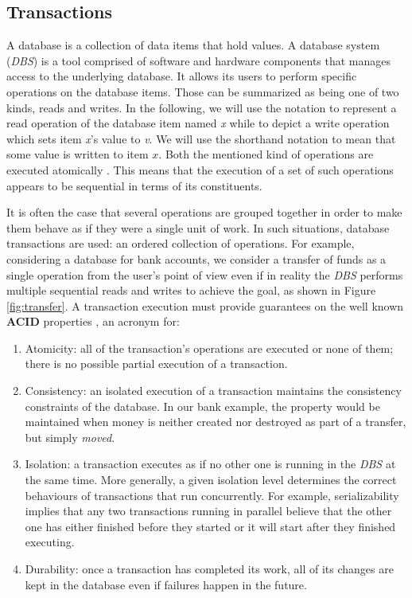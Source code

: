 \tocless\subsection{Transactions}

A database is a collection of data items that hold values. A database system (\textit{DBS}) is a tool comprised of software and hardware components that manages access to the underlying database. It allows its users to perform specific operations on the database items. Those can be summarized as being one of two kinds, reads and writes. In the following, we will use the notation  to represent a read operation of the database item named \textit{x} while  to depict a write operation which sets item \textit{x}'s value to \textit{v}. We will use the shorthand notation  to mean that some value is written to item $x$. Both the mentioned kind of operations are executed atomically \cite{ccontrol}. This means that the execution of a set of such operations appears to be sequential in terms of its constituents.

It is often the case that several operations are grouped together in order to make them behave as if they were a single unit of work. In such situations, database transactions are used: an ordered collection of operations. For example, considering a database for bank accounts, we consider a transfer of funds as a single operation from the user's point of view even if in reality the \textit{DBS} performs multiple sequential reads and writes to achieve the goal, as shown in Figure \ref{fig:transfer}. A transaction execution must provide guarantees on the well known \textbf{ACID} properties \cite{dbconcepts}, an acronym for:
\begin{enumerate}[ref=(\arabic*)]
\item \label{acid.a} Atomicity: all of the transaction's operations are executed or none of them; there is no possible partial execution of a transaction.
\item \label{acid.c} Consistency: an isolated execution of a transaction maintains the consistency constraints of the database. In our bank example, the property would be maintained when money is neither created nor destroyed as part of a transfer, but simply \textit{moved}.
\item \label{acid.i} Isolation: a transaction executes as if no other one is running in the \textit{DBS} at the same time. More generally, a given isolation level determines the correct behaviours of transactions that run concurrently. For example, serializability implies that any two transactions running in parallel believe that the other one has either finished before they started or it will start after they finished executing.
\item \label{acid.d} Durability: once a transaction has completed its work, all of its changes are kept in the database even if failures happen in the future.
\end{enumerate}

